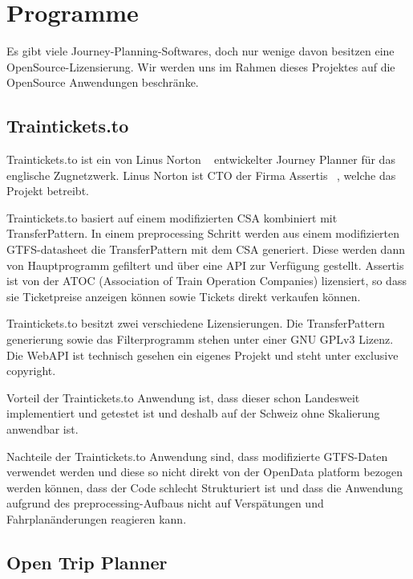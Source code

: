 

\section[Programme]{Programme}
\label{sec:programme}

Es gibt viele Journey-Planning-Softwares, doch nur wenige davon besitzen eine OpenSource-Lizensierung. Wir werden uns im Rahmen dieses Projektes auf die OpenSource Anwendungen beschränke.

\subsection{Traintickets.to} 
\label{sec:Traintickets.to}

Traintickets.to ist ein von Linus Norton ~\cite{LinusNorton} entwickelter Journey Planner für das englische Zugnetzwerk. Linus Norton ist CTO der Firma Assertis ~\cite{assertis}, welche das Projekt betreibt. ~\cite{noauthor_so_nodate}


Traintickets.to basiert auf einem modifizierten CSA kombiniert mit TransferPattern. In einem preprocessing Schritt werden aus einem modifizierten GTFS-datasheet die TransferPattern mit dem CSA generiert. Diese werden dann von Hauptprogramm gefiltert und über eine API zur Verfügung gestellt. Assertis ist von der ATOC (Association of Train Operation Companies) lizensiert, so dass sie Ticketpreise anzeigen können sowie Tickets direkt verkaufen können.

Traintickets.to besitzt zwei verschiedene Lizensierungen. Die TransferPattern generierung sowie das Filterprogramm stehen unter einer GNU GPLv3 Lizenz. Die WebAPI ist technisch gesehen ein eigenes Projekt und steht unter exclusive copyright.

Vorteil der Traintickets.to Anwendung ist, dass dieser schon Landesweit implementiert und getestet ist und deshalb auf der Schweiz ohne Skalierung anwendbar ist. ~\cite{testus} ~\cite{noauthor_train_nodate}

Nachteile der Traintickets.to Anwendung sind, dass modifizierte GTFS-Daten verwendet werden und diese so nicht direkt von der OpenData platform bezogen werden können, dass der Code schlecht Strukturiert ist und dass die Anwendung aufgrund des preprocessing-Aufbaus nicht auf Verspätungen und Fahrplanänderungen reagieren kann.
     


\subsection{Open Trip Planner}
\label{sec:OTP}

